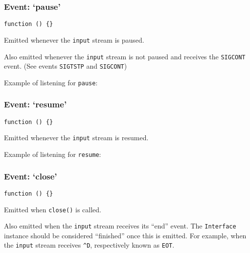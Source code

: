 \subsubsection{Event: `pause'}

\texttt{function () \{\}}

Emitted whenever the \texttt{input} stream is paused.

Also emitted whenever the \texttt{input} stream is not paused and
receives the \texttt{SIGCONT} event. (See events \texttt{SIGTSTP} and
\texttt{SIGCONT})

Example of listening for \texttt{pause}:

\begin{Shaded}
\begin{Highlighting}[]
\NormalTok{(}\NormalTok{, }\NormalTok{() \{}
  \NormalTok{(}\NormalTok{);}
\NormalTok{\});}
\end{Highlighting}
\end{Shaded}

\subsubsection{Event: `resume'}

\texttt{function () \{\}}

Emitted whenever the \texttt{input} stream is resumed.

Example of listening for \texttt{resume}:

\begin{Shaded}
\begin{Highlighting}[]
\NormalTok{(}\NormalTok{, }\NormalTok{() \{}
  \NormalTok{(}\NormalTok{);}
\NormalTok{\});}
\end{Highlighting}
\end{Shaded}

\subsubsection{Event: `close'}

\texttt{function () \{\}}

Emitted when \texttt{close()} is called.

Also emitted when the \texttt{input} stream receives its ``end'' event.
The \texttt{Interface} instance should be considered ``finished'' once
this is emitted. For example, when the \texttt{input} stream receives
\texttt{\^{}D}, respectively known as \texttt{EOT}.

